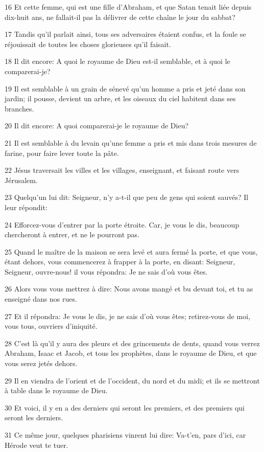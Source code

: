 \par 16 Et cette femme, qui est une fille d'Abraham, et que Satan tenait liée depuis dix-huit ans, ne fallait-il pas la délivrer de cette chaîne le jour du sabbat?
\par 17 Tandis qu'il parlait ainsi, tous ses adversaires étaient confus, et la foule se réjouissait de toutes les choses glorieuses qu'il faisait.
\par 18 Il dit encore: A quoi le royaume de Dieu est-il semblable, et à quoi le comparerai-je?
\par 19 Il est semblable à un grain de sénevé qu'un homme a pris et jeté dans son jardin; il pousse, devient un arbre, et les oiseaux du ciel habitent dans ses branches.
\par 20 Il dit encore: A quoi comparerai-je le royaume de Dieu?
\par 21 Il est semblable à du levain qu'une femme a pris et mis dans trois mesures de farine, pour faire lever toute la pâte.
\par 22 Jésus traversait les villes et les villages, enseignant, et faisant route vers Jérusalem.
\par 23 Quelqu'un lui dit: Seigneur, n'y a-t-il que peu de gens qui soient sauvés? Il leur répondit:
\par 24 Efforcez-vous d'entrer par la porte étroite. Car, je vous le dis, beaucoup chercheront à entrer, et ne le pourront pas.
\par 25 Quand le maître de la maison se sera levé et aura fermé la porte, et que vous, étant dehors, vous commencerez à frapper à la porte, en disant: Seigneur, Seigneur, ouvre-nous! il vous répondra: Je ne sais d'où vous êtes.
\par 26 Alors vous vous mettrez à dire: Nous avons mangé et bu devant toi, et tu as enseigné dans nos rues.
\par 27 Et il répondra: Je vous le dis, je ne sais d'où vous êtes; retirez-vous de moi, vous tous, ouvriers d'iniquité.
\par 28 C'est là qu'il y aura des pleurs et des grincements de dents, quand vous verrez Abraham, Isaac et Jacob, et tous les prophètes, dans le royaume de Dieu, et que vous serez jetés dehors.
\par 29 Il en viendra de l'orient et de l'occident, du nord et du midi; et ils se mettront à table dans le royaume de Dieu.
\par 30 Et voici, il y en a des derniers qui seront les premiers, et des premiers qui seront les derniers.
\par 31 Ce même jour, quelques pharisiens vinrent lui dire: Va-t'en, pars d'ici, car Hérode veut te tuer.
